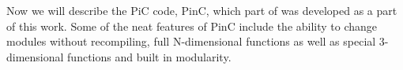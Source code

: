 	Now we will describe the PiC code, PinC, which part of was developed as
	a part of this work. Some of the neat features of PinC include the ability
	to change modules without recompiling, full N-dimensional functions as well
	as special 3-dimensional functions and built in modularity.

